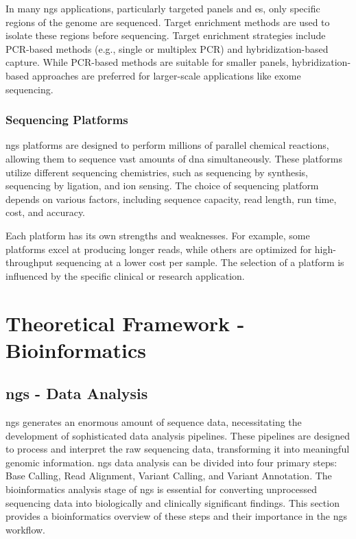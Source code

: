 In many \ac{ngs} applications, particularly targeted panels and \ac{es}, only specific regions of the genome are sequenced. Target enrichment methods are used to isolate these regions before sequencing. Target enrichment strategies include PCR-based methods (e.g., single or multiplex PCR) and hybridization-based capture. While PCR-based methods are suitable for smaller panels, hybridization-based approaches are preferred for larger-scale applications like exome sequencing. \cite{Rehm2013}

\subsubsection{\textbf{Sequencing Platforms}} \label{subsubsec:ngs_platforms}

\ac{ngs} platforms are designed to perform millions of parallel chemical reactions, allowing them to sequence vast amounts of \ac{dna} simultaneously. These platforms utilize different sequencing chemistries, such as sequencing by synthesis, sequencing by ligation, and ion sensing. \cite{glenn2011} The choice of sequencing platform depends on various factors, including sequence capacity, read length, run time, cost, and accuracy. \cite{Rehm2013}

Each platform has its own strengths and weaknesses. For example, some platforms excel at producing longer reads, while others are optimized for high-throughput sequencing at a lower cost per sample. The selection of a platform is influenced by the specific clinical or research application. \cite{Rehm2013}


\section{Theoretical Framework - Bioinformatics} \label{sec:intro_bioinformatics}

\subsection{\acl{ngs} - Data Analysis} \label{subsec:ngs_data_analysis}

\ac{ngs} generates an enormous amount of sequence data, necessitating the development of sophisticated data analysis pipelines. These pipelines are designed to process and interpret the raw sequencing data, transforming it into meaningful genomic information. \ac{ngs} data analysis can be divided into four primary steps: Base Calling, Read Alignment, Variant Calling, and Variant Annotation. The bioinformatics analysis stage of \ac{ngs} is essential for converting unprocessed sequencing data into biologically and clinically significant findings. This section provides a bioinformatics overview of these steps and their importance in the \ac{ngs} workflow. \cite{Rehm2013}

